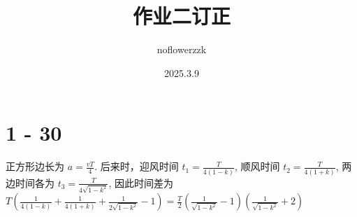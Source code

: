\documentclass{article}
\title{作业二订正}
\author{noflowerzzk}
\date{2025.3.9}
\begin{document}
\maketitle

\section*{1 - 30}

正方形边长为 $a = \frac{vT}{4}$. 后来时，迎风时间 $t_1 = \frac{T}{4(1 - k)}$, 顺风时间 $t_2 = \frac{T}{4(1 + k)}$, 两边时间各为 $t_3 = \frac{T}{4\sqrt{1 - k^2}}$, 因此时间差为 $T\left(\frac{1}{4(1 - k)} + \frac{1}{4(1 + k)} + \frac{1}{2\sqrt{1 - k^2}} - 1\right) = \frac{T}{2}\left(\frac{1}{\sqrt{1 - k^2}} - 1\right)\left(\frac{1}{\sqrt{1 - k^2}} + 2\right)$
\end{document}
